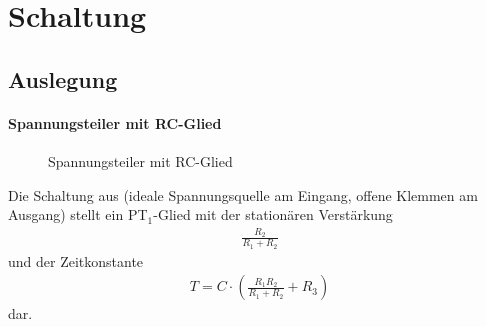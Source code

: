 
\chapter{Schaltung}




\section{Auslegung}



\subsubsection{Spannungsteiler mit RC-Glied}

\begin{figure}[htb]%
	\centering
	\caption{Spannungsteiler mit RC-Glied}%
	\label{fig:VDivRC}%
\end{figure}		

Die Schaltung aus  (ideale Spannungsquelle am Eingang, offene Klemmen am Ausgang) stellt ein PT$_1$-Glied mit der stationären Verstärkung
\begin{align*}
	\frac{R_2}{R_1 + R_2}
\end{align*}
und der Zeitkonstante
\begin{align*}
	T = C \cdot \left( \frac{R_1 R_2}{R_1 + R_2} + R_3 \right)
\end{align*}
dar.